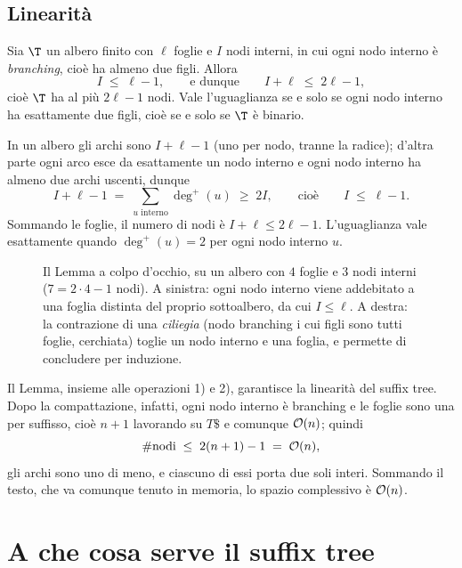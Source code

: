 \subsection{Linearità}

\begin{lemma}\label{lem:branching}
Sia $\T$ un albero finito con $\ell$ foglie e $I$ nodi interni, in cui ogni nodo interno è
\emph{branching}, cioè ha almeno due figli. Allora
\[
  I \;\le\; \ell - 1,
  \qquad\text{e dunque}\qquad
  I + \ell \;\le\; 2\ell - 1 ,
\]
cioè $\T$ ha al più $2\ell-1$ nodi. Vale l'uguaglianza se e solo se ogni nodo interno ha
esattamente due figli, cioè se e solo se $\T$ è binario.
\end{lemma}

\begin{dimostrazione}
In un albero gli archi sono $I + \ell - 1$ (uno per nodo, tranne la radice); d'altra parte
ogni arco esce da esattamente un nodo interno e ogni nodo interno ha almeno due archi
uscenti, dunque
\[
  I + \ell - 1 \;=\; \sum_{u \text{ interno}} \deg^{+}(u) \;\ge\; 2I ,
  \qquad\text{cioè}\qquad I \;\le\; \ell - 1 .
\]
Sommando le foglie, il numero di nodi è $I + \ell \le 2\ell - 1$. L'uguaglianza vale
esattamente quando $\deg^{+}(u) = 2$ per ogni nodo interno $u$.
\end{dimostrazione}

\begin{figure}[H]
\centering

\caption{Il Lemma a colpo d'occhio, su un albero con $4$ foglie e $3$ nodi interni
($7 = 2\cdot 4 - 1$ nodi). A sinistra: ogni nodo interno viene addebitato a una foglia
distinta del proprio sottoalbero, da cui $I \le \ell$. A destra: la contrazione di una
\emph{ciliegia} (nodo branching i cui figli sono tutti foglie, cerchiata) toglie un nodo
interno e una foglia, e permette di concludere per induzione.}
\label{fig:lemma-branching}
\end{figure}

Il Lemma, insieme alle operazioni 1) e 2), garantisce la linearità del suffix tree. Dopo la
compattazione, infatti, ogni nodo interno è branching e le foglie sono una per suffisso,
cioè $n+1$ lavorando su $T\$$ e comunque $\mathcal{O}(n)$; quindi
\[
  \#\text{nodi} \;\le\; 2(n+1) - 1 \;=\; \mathcal{O}(n),
\]
gli archi sono uno di meno, e ciascuno di essi porta due soli interi. Sommando il testo, che
va comunque tenuto in memoria, lo spazio complessivo è $\mathcal{O}(n)$.

\section{A che cosa serve il suffix tree}

